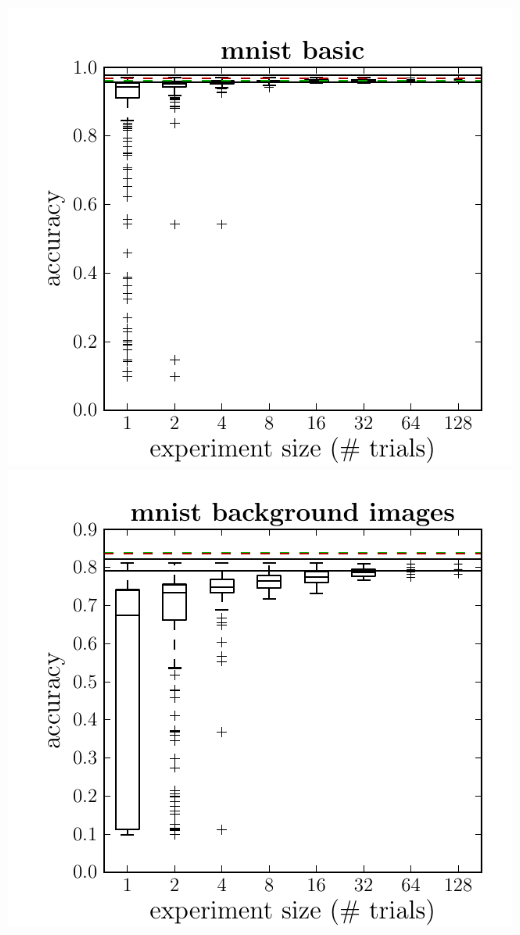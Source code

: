 \documentclass[12pt]{scrartcl}
\begin{document}
\vspace{-0.9em}
\includegraphics[scale=0.40]{figures/dbn_efficiency/dbn_efficiency_mnist_basic}
\includegraphics[scale=0.40]{figures/dbn_efficiency/dbn_efficiency_mnist_background_images}
\end{document}
